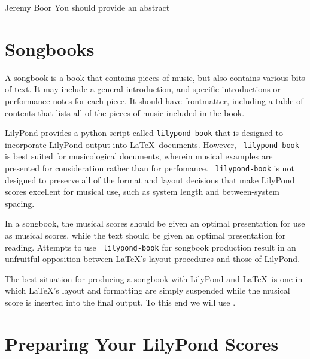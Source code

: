 \documentclass[../../LilyPond-Tutorials]{subfiles}
\begin{document}

\begin{authorAbstract}{Jeremy Boor}
You should provide an abstract
\end{authorAbstract}

\section*{Songbooks}
 A songbook is a book that contains pieces of music, but also contains various bits of text.  It may include a general introduction, and specific introductions or performance notes for each piece. It should have frontmatter, including a table of contents that lists all of the pieces of music included in the book. 

LilyPond provides a python script called  \texttt{lilypond-book} that is designed to incorporate LilyPond output into \LaTeX\ documents. However, \texttt{ lilypond-book} is best suited for musicological documents, wherein musical examples are presented for consideration rather than for perfomance. \texttt{ lilypond-book} is not designed to preserve all of the format and layout decisions that make LilyPond scores excellent for musical use, such as system length and between-system spacing. 

In a songbook, the musical scores should be given an optimal presentation for use as musical scores, while the text should be given an optimal presentation for reading. Attempts to use \texttt{ lilypond-book} for songbook production result in an unfruitful opposition between \LaTeX's layout procedures and those of LilyPond.

The best situation for producing a songbook with LilyPond and \LaTeX\ is one in which \LaTeX's layout and formatting are simply suspended while the musical score is inserted into the final output. To this end we will use  .

\section*{Preparing Your LilyPond Scores}
\end{document}

